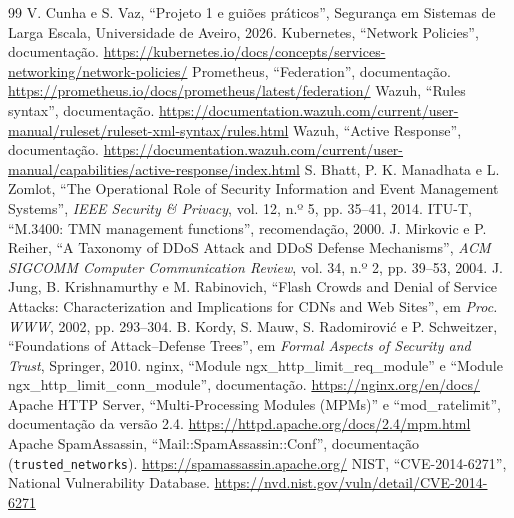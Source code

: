 \documentclass[conference,a4paper]{IEEEtran}
\newcommand{\code}[1]{\texttt{\small #1}}
\begin{document}
\begin{thebibliography}{99}
 V. Cunha e S. Vaz, ``Projeto 1 e guiões práticos'', Segurança em Sistemas de Larga Escala, Universidade de Aveiro, 2026.
 Kubernetes, ``Network Policies'', documentação. \url{https://kubernetes.io/docs/concepts/services-networking/network-policies/}
 Prometheus, ``Federation'', documentação. \url{https://prometheus.io/docs/prometheus/latest/federation/}
 Wazuh, ``Rules syntax'', documentação. \url{https://documentation.wazuh.com/current/user-manual/ruleset/ruleset-xml-syntax/rules.html}
 Wazuh, ``Active Response'', documentação. \url{https://documentation.wazuh.com/current/user-manual/capabilities/active-response/index.html}
 S. Bhatt, P. K. Manadhata e L. Zomlot, ``The Operational Role of Security Information and Event Management Systems'', \emph{IEEE Security \& Privacy}, vol. 12, n.º 5, pp. 35--41, 2014.
 ITU-T, ``M.3400: TMN management functions'', recomendação, 2000.
 J. Mirkovic e P. Reiher, ``A Taxonomy of DDoS Attack and DDoS Defense Mechanisms'', \emph{ACM SIGCOMM Computer Communication Review}, vol. 34, n.º 2, pp. 39--53, 2004.
 J. Jung, B. Krishnamurthy e M. Rabinovich, ``Flash Crowds and Denial of Service Attacks: Characterization and Implications for CDNs and Web Sites'', em \emph{Proc. WWW}, 2002, pp. 293--304.
 B. Kordy, S. Mauw, S. Radomirović e P. Schweitzer, ``Foundations of Attack--Defense Trees'', em \emph{Formal Aspects of Security and Trust}, Springer, 2010.
 nginx, ``Module ngx\_http\_limit\_req\_module'' e ``Module ngx\_http\_limit\_conn\_module'', documentação. \url{https://nginx.org/en/docs/}
 Apache HTTP Server, ``Multi-Processing Modules (MPMs)'' e ``mod\_ratelimit'', documentação da versão 2.4. \url{https://httpd.apache.org/docs/2.4/mpm.html}
 Apache SpamAssassin, ``Mail::SpamAssassin::Conf'', documentação (\code{trusted\_networks}). \url{https://spamassassin.apache.org/}
 NIST, ``CVE-2014-6271'', National Vulnerability Database. \url{https://nvd.nist.gov/vuln/detail/CVE-2014-6271}
\end{thebibliography}
\end{document}
